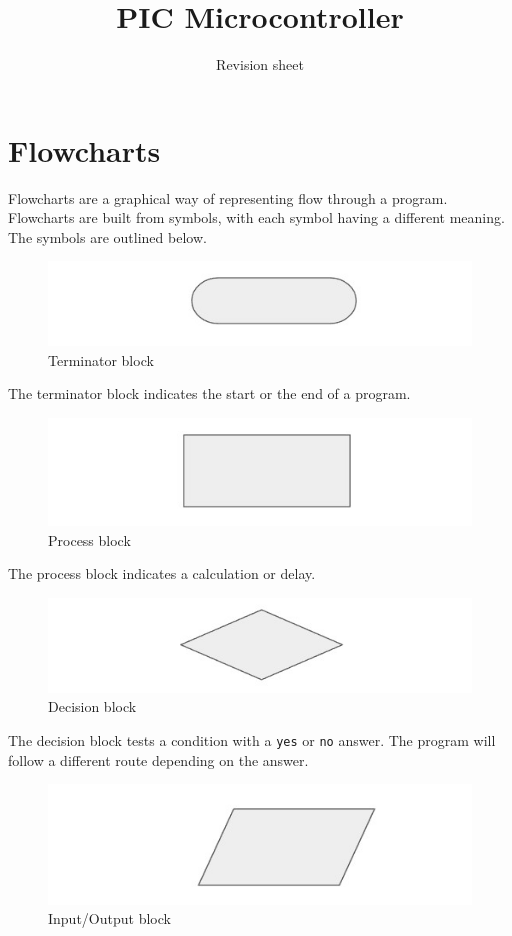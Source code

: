 \documentclass[a4paper,11pt, twocolumn]{article}
\title{PIC Microcontroller}
\author{Revision sheet}
\date{}
\begin{document}
\maketitle
\thispagestyle{fancy}

\section{Flowcharts}
Flowcharts are a graphical way of representing flow through a program. Flowcharts are built from symbols, with each symbol having a different meaning. The symbols are outlined below.
\begin{figure}[H]
    \centering
    \includegraphics[width=\linewidth]{fcTerminator.jpg}
    \caption{Terminator block}
\end{figure}
\noindent The terminator block indicates the start or the end of a program.
\begin{figure}[H]
    \centering
    \includegraphics[width=\linewidth]{fcProcess.jpg}
    \caption{Process block}
\end{figure}
\noindent The process block indicates a calculation or delay.
\begin{figure}[H]
    \centering
    \includegraphics[width=\linewidth]{fcDecision.jpg}
    \caption{Decision block}
\end{figure}
\noindent The decision block tests a condition with a \verb|yes| or \verb|no| answer. The program will follow a different route depending on the answer.
\begin{figure}[H]
    \centering
    \includegraphics[width=\linewidth]{fcIO.jpg}
    \caption{Input/Output block}
\end{figure}
\end{document}
